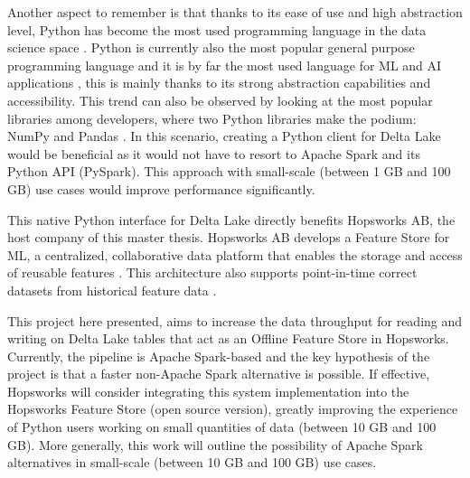 Another aspect to remember is that thanks to its ease of use and high abstraction level, Python has become the most used programming language in the data science space \cite{nagpalPythonDataAnalytics2019}. Python is currently also the most popular general purpose programming language \cite{TIOBEIndex, StackOverflowDeveloper} and it is by far the most used language for \gls{ML} and \gls{AI} applications \cite{python-machine-learning}, this is mainly thanks to its strong abstraction capabilities and accessibility. This trend can also be observed by looking at the most popular libraries among developers, where two Python libraries make the podium: NumPy and Pandas \cite{StackOverflowDeveloper}.
In this scenario, creating a Python client for Delta Lake would be beneficial as it would not have to resort to Apache Spark and its Python \gls{API} (PySpark). This approach with small-scale (between 1 GB and 100 GB) use cases would improve performance significantly.

This native Python interface for Delta Lake directly benefits Hopsworks AB, the host company of this master thesis. Hopsworks AB develops a Feature Store for \gls{ML}, a centralized, collaborative data platform that enables the storage and access of reusable features \cite{HopsworksBatchRealtime2024}. This architecture also supports point-in-time correct datasets from historical feature data \cite{Pettersson1695672}.

This project here presented, aims to increase the data throughput for reading and writing on Delta Lake tables that act as an Offline Feature Store in Hopsworks. Currently, the pipeline is Apache Spark-based and the key hypothesis of the project is that a faster non-Apache Spark alternative is possible. If effective, Hopsworks will consider integrating this system implementation into the Hopsworks Feature Store (open source version), greatly improving the experience of Python users working on small quantities of data (between 10 GB and 100 GB). More generally, this work will outline the possibility of Apache Spark alternatives in small-scale (between 10 GB and 100 GB) use cases.